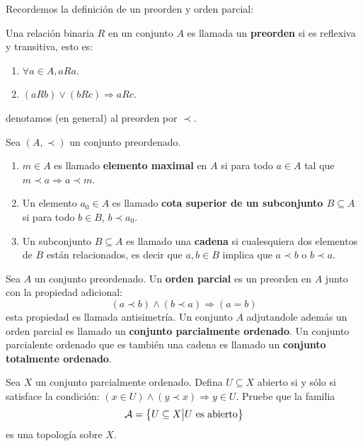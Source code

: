 \documentclass[12pt]{report}
\theoremstyle{largebreak}
\begin{document}
    Recordemos la definición de un preorden y orden parcial:

    \begin{mydef}
        Una relación binaria $R$ en un conjunto $A$ es llamada un \textbf{preorden} si es reflexiva y transitiva, esto es:
        \begin{enumerate}
            \item $\forall a\in A, aRa$.
            \item $(aRb)\lor(bRc)\Rightarrow aRc$.
        \end{enumerate}
        denotamos (en general) al preorden por $\prec$.
    \end{mydef}

    \begin{mydef}
        Sea $(A,\prec)$ un conjunto preordenado.
        \begin{enumerate}
            \item $m\in A$ es llamado \textbf{elemento maximal} en $A$ si para todo $a\in A$ tal que $m\prec a\Rightarrow a\prec m$.
            \item Un elemento $a_0\in A$ es llamado \textbf{cota superior de un subconjunto $B\subseteq A$} si para todo $b\in B$, $b\prec a_0$.
            \item Un subconjunto $B\subseteq A$ es llamado una \textbf{cadena} si cualesquiera dos elementos de $B$ están relacionados, es decir que $a,b\in B$ implica que $a\prec b$ o $b\prec a$.
        \end{enumerate}
    \end{mydef}
    
    \begin{mydef}
        Sea $A$ un conjunto preordenado. Un \textbf{orden parcial} es un preorden en $A$ junto con la propiedad adicional:
        \begin{equation*}
            (a\prec b)\land (b\prec a)\Rightarrow (a=b)
        \end{equation*}
        esta propiedad es llamada antisimetría. Un conjunto $A$ adjutandole además un orden parcial es llamado un \textbf{conjunto parcialmente ordenado}. Un conjunto parcialente ordenado que es también una cadena es llamado un \textbf{conjunto totalmente ordenado}.
    \end{mydef}

    \begin{excer}
        Sea $X$ un conjunto parcialmente ordenado. Defina $U\subseteq X$ abierto si y sólo si satisface la condición: $(x\in U)\land (y\prec x)\Rightarrow y\in U$. Pruebe que la familia
        \begin{equation*}
            \mathcal{A}=\left\{U\subseteq X\big| U\textup{ es abierto} \right\}
        \end{equation*}
        es una topología sobre $X$.
    \end{excer}
\end{document}
